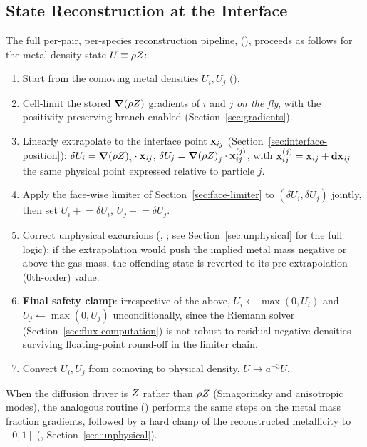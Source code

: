 \subsection{State Reconstruction at the Interface}
\label{sec:state-reconstruction}
The full per-pair, per-species reconstruction pipeline,
(), proceeds as follows for
the metal-density state $U \equiv \rho Z$:
\begin{enumerate}
  \item Start from the comoving metal densities $U_i, U_j$
        ().
  \item Cell-limit the stored $\grad(\rho Z)$ gradients of $i$ and $j$
        \emph{on the fly}, with the positivity-preserving branch enabled
        (Section~\ref{sec:gradients}).
  \item Linearly extrapolate to the interface point $\mathbf{x}_{ij}$
        (Section~\ref{sec:interface-position}):
        $\delta U_i = \grad(\rho Z)_i \cdot \mathbf{x}_{ij}$,
        $\delta U_j = \grad(\rho Z)_j \cdot \mathbf{x}_{ij}^{(j)}$, with
        $\mathbf{x}_{ij}^{(j)} = \mathbf{x}_{ij} + \mathbf{dx}_{ij}$ the same physical point
        expressed relative to particle $j$.
  \item Apply the face-wise limiter of Section~\ref{sec:face-limiter} to
        $(\delta U_i,\delta U_j)$ jointly, then set
        $U_i \mathrel{+}= \delta U_i$, $U_j \mathrel{+}= \delta U_j$.
  \item Correct unphysical excursions
        (,
        ; see
        Section~\ref{sec:unphysical} for the full logic): if the
        extrapolation would push the implied metal mass negative or
        above the gas mass, the offending state is reverted to its
        pre-extrapolation (0th-order) value.
  \item \textbf{Final safety clamp}: irrespective of the above,
        $U_i \gets \max(0, U_i)$ and $U_j \gets \max(0, U_j)$
        unconditionally, since the Riemann solver
        (Section~\ref{sec:flux-computation}) is not robust to residual
        negative densities surviving floating-point round-off in the
        limiter chain.
  \item Convert $U_i, U_j$ from comoving to physical density,
        $U \to a^{-3} U$.
\end{enumerate}
When the diffusion driver is $Z$ rather than $\rho Z$ (Smagorinsky
and anisotropic modes), the analogous routine
() performs the same steps on the
metal mass fraction gradients, followed by a hard clamp of the
reconstructed metallicity to $[0,1]$
(,
Section~\ref{sec:unphysical}).

